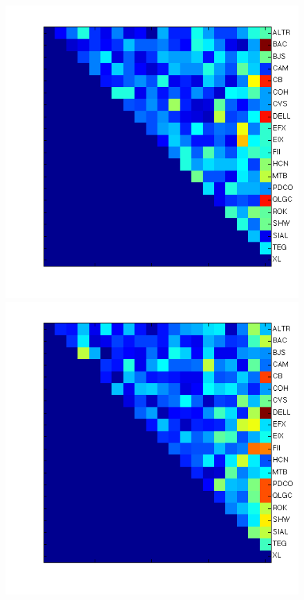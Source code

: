 \documentclass{article}
\begin{document}
\begin{figure}[!tbp]
  \centering               
  \includegraphics[height=0.18\textheight]{fig/stocks1.png}
  \includegraphics[height=0.18\textheight]{fig/stocks2.png}

\end{figure}
\end{document}
